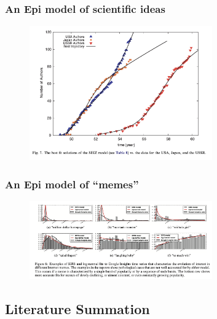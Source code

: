 \documentclass[pdflatex]{beamer}
\begin{document}
\begin{frame}
	\frametitle{An Epi model of scientific ideas}
\begin{figure}[!ht] \centering  %
	\caption{\href{http://web.mit.edu/dikaiser/www/BAKC.PhysA.pdf}{\cite{bettencourt2006power}}}
	\label{fig:science_ideas_curve}
	\centerline{\includegraphics[width=0.7\textwidth]{./figures/Feynman.png}}
\end{figure}
\end{frame}


\begin{frame}
	\frametitle{An Epi model of ``memes''}
	\begin{figure}[!ht] \centering  %
		\caption{\href{https://github.com/iworld1991/EpiExp/blob/master/Literature/bauckhage2011insights.pdf}{\cite{bauckhage2011insights}}}
		\label{fig:memes_curve}
		\centerline{\includegraphics[width=0.7\textwidth]{./figures/Memes.png}}
	\end{figure}
\end{frame}


\subsection{Literature Summation}
\end{document}
